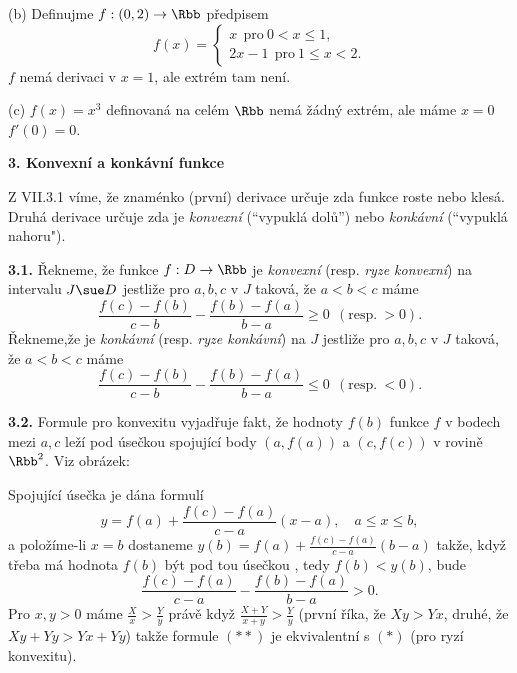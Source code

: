 \documentclass[12pt]{article}
\begin{document}
{{(b) Definujme $f:(0,2)\to \Rbb$ předpisem
 $$
 f(x)=\begin{cases}x\ \  \text{pro} \ 0<x\leq 1,\\
                    2x-1 \ \ \text{pro} \ 1\leq x< 2.\end{cases}
$$ 
$f$ nemá derivaci v $x=1$, ale extrém tam není.

(c) $f(x)=x^3$ definovaná na celém $\Rbb$ nemá žádný extrém, ale máme $x=0$ 
$f'(0)=0$.

\vskip10mm
 
 {\large\bf 3. Konvexní a konkávní funkce}
 
 \bigskip
 
Z VII.3.1 víme, že znaménko (první) derivace určuje zda funkce roste nebo klesá. Druhá derivace určuje zda je
 {\em konvexní} (``vypuklá dolů'') nebo {\em konkávní} (``vypuklá nahoru").
 
 \bigskip
 
 {\bf 3.1.} Řekneme, že funkce $f:D\to \Rbb$ je
 {\em konvexní} (resp. {\em ryze konvexní}) na intervalu $J\sue D$ jestliže pro  $a,b,c$ v $J$ taková, že $a<b<c$ máme
 \begin{equation}
 \frac{f(c)-f(b)}{c-b}-\frac{f(b)-f(a)}{b-a}\geq 0\ \ (\text{resp.}\ >0). \tag{$*$}
 \end{equation}
 Řekneme,že je  {\em konkávní} (resp. {\em ryze konkávní}) na $J$ jestliže pro  $a,b,c$ v $J$ taková, že $a<b<c$ máme
 $$
 \frac{f(c)-f(b)}{c-b}-\frac{f(b)-f(a)}{b-a}\leq 0\ \ (\text{resp.}\ <0).
 $$
 
 \bigskip
 
 {\bf 3.2.} Formule pro konvexitu  vyjadřuje fakt, že hodnoty $f(b)$ funkce $f$ v bodech mezi $a,c$ leží pod úsečkou spojující body $(a,f(a))$ a $(c,f(c))$ v rovině $\Rbb^2$. Viz obrázek:
 
  
   \centerline{
}

\bigskip

\noindent Spojující úsečka je dána formulí
$$
y=f(a)+\frac{f(c)-f(a)}{c-a}(x-a), \quad a\leq x\leq b,
$$
a položíme-li $x=b$ dostaneme $y(b)=f(a)+\frac{f(c)-f(a)}{c-a}(b-a)$
takže, když třeba má hodnota $f(b)$ být pod tou úsečkou , tedy $f(b)<y(b)$, bude
\begin{equation}
 \frac{f(c)-f(a)}{c-a}-\frac{f(b)-f(a)}{b-a} >0. \tag{$**$}
 \end{equation}
Pro $x,y>0$ máme $\frac{X}{x}>\frac{Y}{y}$ právě když
 $\frac{X+Y}{x+y}>\frac{Y}{y}$ (první říka, že $Xy>Yx$, druhé, že $Xy+Yy>Yx+Yy$) takže formule $(**)$ je ekvivalentní s $(*)$ (pro ryzí konvexitu).
 
}}
\end{document}

